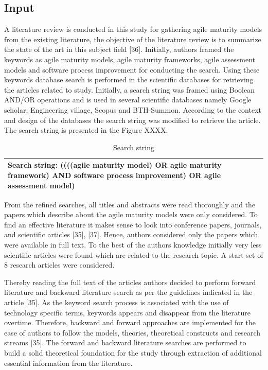 \documentclass[a4paper,oneside]{bth}
\begin{document}
\subsection{Input}
A literature review is conducted in this study for gathering agile maturity models from the existing literature, the objective of the literature review is to summarize the state of the art in this subject field [36]. Initially, authors framed the keywords as agile maturity models, agile maturity frameworks, agile assessment models and software process improvement for conducting the search. Using these keywords database search is performed in the scientific databases for retrieving the articles related to study. Initially, a search string was framed using Boolean AND/OR operations and is used in several scientific databases namely Google scholar, Engineering village, Scopus and BTH-Summon. According to the context and design of the databases the search string was modified to retrieve the article. The search string is presented in the Figure XXXX.
\begin{table}[h] 
\centering
\caption{Search string}
\label{search string}
\begin{tabular} {|p{9cm}|}
\hline
\textbf{Search string:} ((((agile maturity model) OR agile maturity framework) AND software process improvement) OR agile assessment model)\\
\hline
\end{tabular}
\end{table}
From the refined searches, all titles and abstracts were read thoroughly and the papers which describe about the agile maturity models were only considered. To find an effective literature it makes sense to look into conference papers, journals, and scientific articles [35], [37]. Hence, authors considered only the papers which were available in full text. To the best of the authors knowledge initially very less scientific articles were found which are related to the research topic. A start set of 8 research articles were considered.

Thereby reading the full text of the articles authors decided to perform forward literature and backward literature search as per the guidelines indicated in the article [35]. As the keyword search process is associated with the use of technology specific terms, keywords appears and disappear from the literature overtime. Therefore, backward and forward approaches are implemented for the ease of authors to follow the models, theories, theoretical constructs and research streams [35]. The forward and backward literature searches are performed to build a solid theoretical foundation for the study through extraction of additional essential information from the literature.
\end{document}
